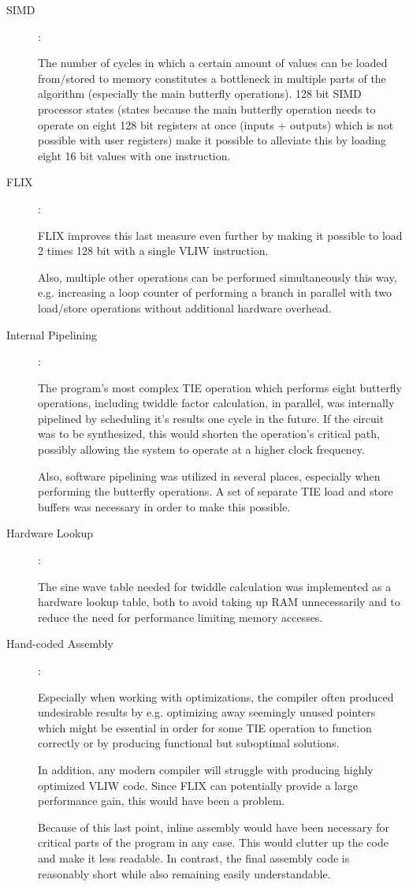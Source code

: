 \documentclass[ngerman, cd=lightcolor]{tudscrreprt}
\begin{document}
\begin{description}
\item[SIMD]:

The number of cycles in which a certain amount of values can be loaded
from/stored to memory constitutes a bottleneck in multiple parts of the
algorithm (especially the main butterfly operations). 128 bit SIMD processor
states (states because the main butterfly operation needs to operate on eight
128 bit registers at once (inputs + outputs) which is not possible with user
registers) make it possible to alleviate this by loading eight 16 bit values
with one instruction.

\item[FLIX]:

FLIX improves this last measure even further by making it possible to load 2
times 128 bit with a single VLIW instruction.

Also, multiple other operations can be performed simultaneously this way, e.g.
increasing a loop counter of performing a branch in parallel with two
load/store operations without additional hardware overhead.

\item[Internal Pipelining]:

The program’s most complex TIE operation which performs eight butterfly
operations, including twiddle factor calculation, in parallel, was internally
pipelined by scheduling it’s results one cycle in the future. If the circuit
was to be synthesized, this would shorten the operation’s critical path,
possibly allowing the system to operate at a higher clock frequency.

Also, software pipelining was utilized in several places, especially when
performing the butterfly operations. A set of separate TIE load and store
buffers was necessary in order to make this possible.

\item[Hardware Lookup]:

The sine wave table needed for twiddle calculation was implemented as a
hardware lookup table, both to avoid taking up RAM unnecessarily and to reduce
the need for performance limiting memory accesses.

\item[Hand-coded Assembly]:

Especially when working with optimizations, the compiler often produced
undesirable results by e.g. optimizing away seemingly unused pointers which
might be essential in order for some TIE operation to function correctly or by
producing functional but suboptimal solutions.

In addition, any modern compiler will struggle with producing highly optimized
VLIW code. Since FLIX can potentially provide a large performance gain, this
would have been a problem.

Because of this last point, inline assembly would have been necessary for
critical parts of the program in any case. This would clutter up the code and
make it less readable. In contrast, the final assembly code is reasonably short
while also remaining easily understandable.
\end{description}
\end{document}
